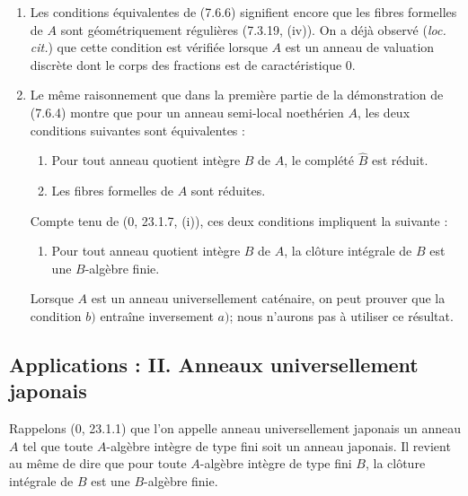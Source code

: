 \begin{remarks}[7.6.7]
\label{IV.2.s7.6.7-fr}
\begin{enumerate}
\item[\emph{(i)}] Les conditions équivalentes de (7.6.6) signifient encore que
les fibres formelles de $A$ sont géométriquement régulières (7.3.19, (iv)). On
a déjà observé (\emph{loc. cit.}) que cette condition est vérifiée lorsque $A$
est un anneau de valuation discrète dont le corps des fractions est de
caractéristique 0.

\item[\emph{(ii)}] Le même raisonnement que dans la première partie de la
démonstration de (7.6.4) montre que pour un anneau semi-local noethérien $A$,
les deux conditions suivantes sont équivalentes :
\begin{enumerate}
\item[\emph{a)}] Pour tout anneau quotient intègre $B$ de $A$, le complété
$\widehat B$ est réduit.
\item[\emph{a$'$)}] Les fibres formelles de $A$ sont réduites.
\end{enumerate}
Compte tenu de (0, 23.1.7, (i)), ces deux conditions impliquent la suivante :
\begin{enumerate}
\item[\emph{b)}] Pour tout anneau quotient intègre $B$ de $A$, la clôture
intégrale de $B$ est une $B$-algèbre finie.
\end{enumerate}
Lorsque $A$ est un anneau universellement caténaire, on peut prouver que la
condition $b)$ entraîne inversement $a)$; nous n'aurons pas à utiliser ce
résultat.
\end{enumerate}
\end{remarks}

\subsection{Applications : II. Anneaux universellement japonais}
\label{IV.2.ss7.7-fr}

\begin{env}[7.7.1]
\label{IV.2.s7.7.1-fr}
Rappelons (0, 23.1.1) que l'on appelle anneau universellement japonais un
anneau $A$ tel que toute $A$-algèbre intègre de type fini soit un anneau
japonais. Il revient au même de dire que pour toute $A$-algèbre intègre de type
fini $B$, la clôture intégrale de $B$ est une $B$-algèbre finie.
\end{env}

